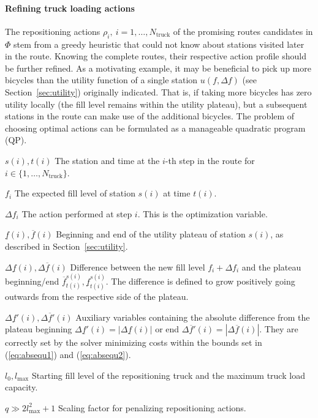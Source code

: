\documentclass{article}
\providecommand{\Ntruck}{N_{\textrm{truck}}}
\begin{document}
\paragraph{Refining truck loading actions}
The repositioning actions $\rho_i,\ i=1,\ldots,\Ntruck$ of the promising routes
candidates in $\Phi$ stem from a greedy heuristic that could not know about
stations visited later in the route. Knowing the complete routes, their
respective action profile should be further refined. As a motivating example,
it may be beneficial to pick up more bicycles than the utility function of a
single station $u(f,\Delta f)$ (see Section~\ref{sec:utility}) originally
indicated. That is, if taking more bicycles has zero utility locally (the
fill level remains within the utility plateau), but a subsequent stations in the
route can make use of the additional bicycles. The problem of choosing optimal
actions can be formulated as a manageable quadratic program (QP).
\begin{IEEEdescription}
\item[$s(i), t(i)$] The station and time at the $i$-th step in the route for $i\in
  \{1,\ldots, \Ntruck\}$.
\item[$f_i$] The expected fill level of station $s(i)$ at time $t(i)$.
\item[$\Delta f_i$] The action performed at step $i$. This is the optimization
  variable.
\item[$\underline f(i),\overline f(i)$] Beginning and end of the utility plateau
  of station $s(i)$, as described in Section~\ref{sec:utility}.
\item[$\Delta \underline f(i),\Delta \overline f(i)$] Difference between the new fill
  level $f_i + \Delta f_i$ and the plateau beginning/end $\overline
  f^{s(i)}_{t(i)}, \underline f^{s(i)}_{t(i)}$. The difference is defined to
  grow positively going outwards from the respective side of the plateau.
\item[$\Delta \underline f'(i),\Delta \overline f'(i)$] Auxiliary variables containing the
  absolute difference from the plateau beginning $\Delta \underline f'(i) =
  |\Delta \underline f(i)|$ or end $\Delta \overline f'(i) = |\Delta \overline
  f(i)|$. They are correctly set by the solver minimizing costs within the
  bounds set in (\ref{eq:absequ1}) and (\ref{eq:absequ2}).
\item[$l_{0}, l_{\max}$] Starting fill level of the repositioning truck and the
  maximum truck load capacity.
\item[$q \gg 2l_{\max}^2+1$] Scaling factor for penalizing repositioning actions.
\end{IEEEdescription}
\end{document}

